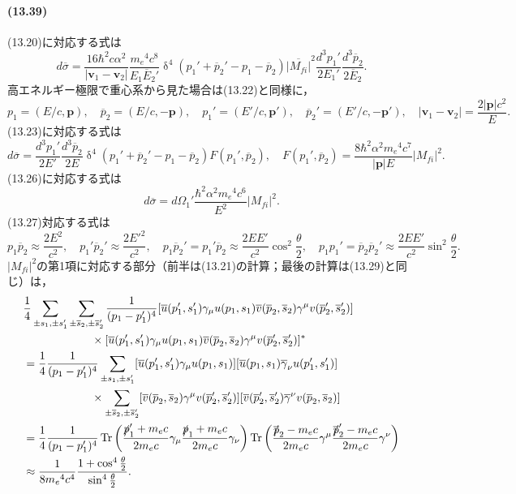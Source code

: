\paragraph{(13.39)}
(13.20)に対応する式は
\[d\overline{\sigma} = \frac{16\hbar^2c\alpha^2}{\lvert\boldsymbol{v}_1 -\boldsymbol{v}_2\rvert} \frac{m_e{}^4c^8}{E_1\overline{E}_2'} \operatorname{\delta}^4(p_1' + \overline{p}_2' - p_1 - \overline{p}_2) \overline{\lvert M_{fi}\rvert}^2 \frac{d^3p_1'}{2E_1'} \frac{d^3\overline{p}_2}{2\overline{E}_2}.\]
高エネルギー極限で重心系から見た場合は(13.22)と同様に，
\[ p_1 = (E/c, \boldsymbol{p}),\quad \overline{p}_2 = (E/c, -\boldsymbol{p}),\quad p_1' = (E'/c, \boldsymbol{p}'),\quad \overline{p}_2' = (E'/c, -\boldsymbol{p}'),\quad \lvert\boldsymbol{v}_1 - \boldsymbol{v}_2 \rvert = \frac{2\lvert\boldsymbol{p}\rvert c^2}{E}. \]
(13.23)に対応する式は
\[d\overline{\sigma} = \frac{d^3p_1'}{2E'} \frac{d^3\overline{p}_2}{2E} \operatorname{\delta}^4(p_1' + \overline{p}_2' - p_1 - \overline{p}_2) F(p_1', \overline{p}_2),\quad F(p_1', \overline{p}_2) = \frac{8\hbar^2\alpha^2m_e{}^4c^7}{\lvert\boldsymbol{p}\rvert E} \lvert M_{fi}\rvert^2. \]
(13.26)に対応する式は
\[d\overline{\sigma} = d\Omega_1'\frac{\hbar^2\alpha^2m_e{}^4c^6}{E^2} \lvert M_{fi}\rvert^2. \]
(13.27)対応する式は
\[ p_1\overline{p}_2 \approx \frac{2E^2}{c^2},\quad p_1'\overline{p}_2' \approx \frac{2E'^2}{c^2},\quad p_1\overline{p}_2' = p_1'\overline{p}_2 \approx \frac{2EE'}{c^2}\cos^2\frac{\theta}{2},\quad p_1p_1' = \overline{p}_2\overline{p}_2' \approx \frac{2EE'}{c^2}\sin^2\frac{\theta}{2}. \]
$\lvert M_{fi}\rvert^2$の第1項に対応する部分（前半は(13.21)の計算；最後の計算は(13.29)と同じ）は，
\begin{align*}
  & \frac{1}{4} \sum_{\pm s_1, \pm s_1'} \sum_{\pm \overline{s}_2, \pm\overline{s}_2'} \frac{1}{(p_1 - p_1')^4} [\overline{u}(p_1', s_1') \gamma_\mu u(p_1, s_1) \overline{v}(\overline{p}_2, \overline{s}_2) \gamma^\mu v(\overline{p}_2', \overline{s}_2')] \\
  &\qquad\qquad\qquad \times [\overline{u}(p_1', s_1') \gamma_\mu u(p_1, s_1) \overline{v}(\overline{p}_2, \overline{s}_2) \gamma^\mu v(\overline{p}_2', \overline{s}_2')]^* \\
  & = \frac{1}{4} \frac{1}{(p_1 - p_1')^4} \sum_{\pm s_1, \pm s_1'} [\overline{u}(p_1', s_1') \gamma_\mu u(p_1, s_1)] [\overline{u}(p_1, s_1) \overline{\gamma}_\nu u(p_1', s_1')] \\
  &\qquad\qquad\qquad \times \sum_{\pm \overline{s}_2, \pm\overline{s}_2'} [\overline{v}(\overline{p}_2, \overline{s}_2) \gamma^\mu v(\overline{p}_2', \overline{s}_2')] [\overline{v}(\overline{p}_2', \overline{s}_2') \overline{\gamma}^\nu v(\overline{p}_2, \overline{s}_2)] \\
  & = \frac{1}{4} \frac{1}{(p_1-p_1')^4} \operatorname{Tr} \left( \frac{\slashed{p}_1'+m_ec}{2m_ec} \gamma_\mu \frac{\slashed{p}_1+m_ec}{2m_ec} \gamma_\nu \right) \operatorname{Tr} \left( \frac{\slashed{\overline{p}}_2 - m_ec}{2m_ec} \gamma^\mu \frac{\slashed{\overline{p}}_2' - m_ec}{2m_ec} \gamma^\nu \right) \\
  & \approx \frac{1}{8m_e{}^4c^4}\frac{1+\cos^4\frac{\theta}{2}}{\sin^4\frac{\theta}{2}}.
\end{align*}
